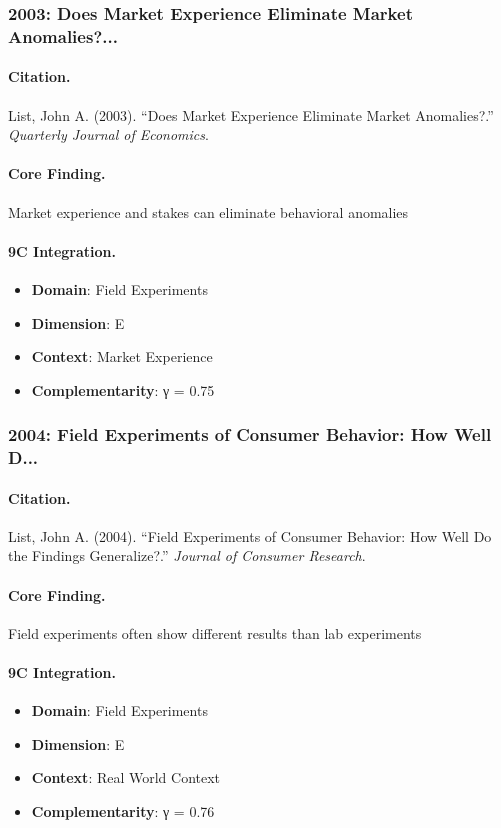 \subsubsection{2003: Does Market Experience Eliminate Market Anomalies?...}

\paragraph{Citation.}
List, John A. (2003). ``Does Market Experience Eliminate Market Anomalies?.''
\textit{Quarterly Journal of Economics}.

\paragraph{Core Finding.}
Market experience and stakes can eliminate behavioral anomalies

\paragraph{9C Integration.}
\begin{itemize}[nosep]
  \item \textbf{Domain}: Field Experiments
  \item \textbf{Dimension}: E
  \item \textbf{Context}: Market Experience
  \item \textbf{Complementarity}: γ = 0.75
\end{itemize}


\subsubsection{2004: Field Experiments of Consumer Behavior: How Well D...}

\paragraph{Citation.}
List, John A. (2004). ``Field Experiments of Consumer Behavior: How Well Do the Findings Generalize?.''
\textit{Journal of Consumer Research}.

\paragraph{Core Finding.}
Field experiments often show different results than lab experiments

\paragraph{9C Integration.}
\begin{itemize}[nosep]
  \item \textbf{Domain}: Field Experiments
  \item \textbf{Dimension}: E
  \item \textbf{Context}: Real World Context
  \item \textbf{Complementarity}: γ = 0.76
\end{itemize}


